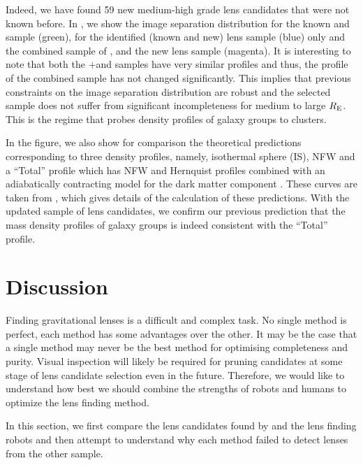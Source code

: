 \documentclass[useAMS,usenatbib,a4paper]{mn2e}
\begin{document}
Indeed, we have found 59 new medium-high grade
lens candidates that were not known
before. In , we show the image separation distribution for
the known \rf and \af sample (green), for the \sw identified (known and
new) lens sample (blue) only and the combined \cfhtls sample of \rf, \af and
the new \sw lens sample (magenta). It is interesting to note that both
the \rf$+$\af and \sw samples have very similar profiles and thus, the profile of the
combined sample has not changed significantly. This implies that previous
constraints on the image separation distribution are robust and the \af
selected sample does not suffer from significant incompleteness for
medium to large $R_{\rm E}$. This is the regime that probes density
profiles of galaxy groups to clusters.

In the figure, we also show for comparison the theoretical predictions
corresponding to three density profiles, namely, isothermal sphere (IS),
NFW and a ``Total'' profile which has NFW and Hernquist
profiles combined with an adiabatically contracting model for the dark
matter component \citep{Gnedin2004}. These curves are taken from
\citet{More2012}, which gives details of the calculation of these
predictions.  With the updated sample of lens candidates, we confirm our
previous prediction that the mass density profiles of galaxy groups is
indeed consistent with the ``Total'' profile.



\section{Discussion}
\label{sec:discuss}

Finding gravitational lenses is a difficult and complex task. No single
method is perfect, each method has some advantages over the other. It
may be the case that a single method may never be the best method for
optimising completeness and purity. Visual inspection will likely be
required for pruning candidates at some stage of lens candidate
selection even in the future. Therefore, we would like to understand how
best we should combine the strengths of robots and humans to optimize
the lens finding method.

In this section, we first compare the lens candidates found by
\sw and the lens finding robots and then attempt to understand why each
method failed to detect lenses from the other sample.
\end{document}
